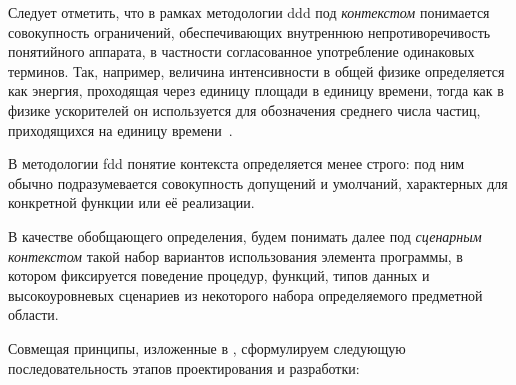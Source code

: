 Следует отметить, что в рамках методологии \acrshort{ddd} под
\emph{контекстом} понимается совокупность ограничений,
обеспечивающих внутреннюю непротиворечивость понятийного аппарата,
в частности согласованное употребление одинаковых терминов.
Так, например, величина интенсивности в общей физике
определяется как энергия, проходящая через единицу площади в единицу
времени, тогда как в физике ускорителей он используется для
обозначения среднего числа частиц, приходящихся на единицу
времени~\cite{Komar1964-accelerators}.

В методологии \acrshort{fdd} понятие контекста определяется менее строго:
под ним обычно подразумевается совокупность допущений и
умолчаний, характерных для конкретной функции или её реализации.

В качестве обобщающего определения, будем понимать далее
под \emph{сценарным контекстом} такой набор вариантов
использования элемента программы, в котором фиксируется
поведение процедур, функций, типов данных и высокоуровневых
сценариев из некоторого набора определяемого предметной области.

Совмещая принципы, изложенные в \cite{coad1999java-fdd, vernon-DDD},
сформулируем следующую последовательность этапов проектирования и
разработки:


